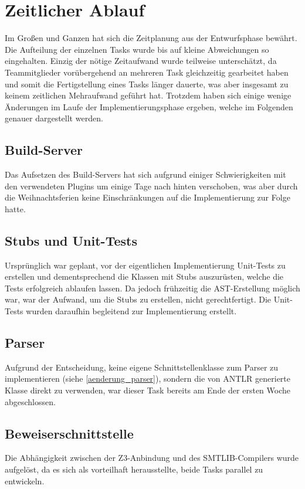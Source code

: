 \section{Zeitlicher Ablauf}

Im Großen und Ganzen hat sich die Zeitplanung aus der Entwurfsphase bewährt. Die Aufteilung der einzelnen Tasks wurde bis auf kleine Abweichungen so eingehalten. Einzig der nötige Zeitaufwand wurde teilweise unterschätzt, da Teammitglieder vorübergehend an mehreren Task gleichzeitig gearbeitet haben und somit die Fertigstellung eines Tasks länger dauerte, was aber insgesamt zu keinem zeitlichen Mehraufwand geführt hat. Trotzdem haben sich einige wenige Änderungen im Laufe der Implementierungsphase ergeben, welche im Folgenden genauer dargestellt werden.

\subsection{Build-Server}
Das Aufsetzen des Build-Servers hat sich aufgrund einiger Schwierigkeiten mit den verwendeten Plugins um einige Tage nach hinten verschoben, was aber durch die Weihnachtsferien keine Einschränkungen auf die Implementierung zur Folge hatte. 

\subsection{Stubs und Unit-Tests}
Ursprünglich war geplant, vor der eigentlichen Implementierung Unit-Tests zu erstellen und dementsprechend die Klassen mit Stubs auszurüsten, welche die Tests erfolgreich ablaufen lassen. Da jedoch frühzeitig die AST-Erstellung möglich war, war der Aufwand, um die Stubs zu erstellen, nicht gerechtfertigt. Die Unit-Tests wurden daraufhin begleitend zur Implementierung erstellt.

\subsection{Parser}
Aufgrund der Entscheidung, keine eigene Schnittstellenklasse zum Parser zu implementieren (siehe \ref{aenderung_parser}), sondern die von ANTLR generierte Klasse direkt zu verwenden, war dieser Task bereits am Ende der ersten Woche abgeschlossen.

\subsection{Beweiserschnittstelle}
Die Abhängigkeit zwischen der Z3-Anbindung und des SMTLIB-Compilers wurde aufgelöst, da es sich als vorteilhaft herausstellte, beide Tasks parallel zu entwickeln.


